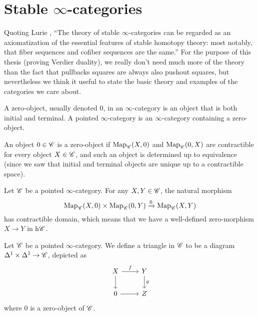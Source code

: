 \documentclass[../../thesis.tex]{subfiles}
\begin{document}
\section{Stable $\infty$-categories}
Quoting Lurie \cite{HA}, ``The theory of stable $\infty$-categories can be regarded as an axiomatization of the essential features of stable homotopy theory: most notably, that fiber sequences and cofiber sequences are the same.''
For the purpose of this thesis (proving Verdier duality), we really don't need much more of the theory than the fact that pullbacks squares are always also pushout squares, but nevertheless we think it useful to state the basic theory and examples of the categories we care about.
\begin{definition}[{\cite[Definition 1.1.1.1.]{HA}}]
    A zero-object, usually denoted $0$, in an $\infty$-category is an object that is both initial and terminal.
    A pointed $\infty$-category is an $\infty$-category containing a zero-object.
\end{definition}
\begin{remark}
    An object $0\in \mathscr{C}$ is a zero-object if $\mathrm{Map}_{\mathscr{C}}(X,0)$ and $\mathrm{Map}_{\mathscr{C}}(0,X)$ are contractible for every object $X\in \mathscr{C}$, and such an object is determined up to equivalence (since we saw that initial and terminal objects are unique up to a contractible space).
\end{remark}
\begin{remark}[{\cite[Remark 1.1.1.3.]{HA}}]
    Let $\mathscr{C}$ be a pointed $\infty$-category.
    For any $X,Y \in \mathscr{C}$, the natural morphism
    \[
        \mathrm{Map}_{\mathscr{C}}(X, 0) \times \mathrm{Map}_{\mathscr{C}}(0, Y) \xrightarrow{0} \mathrm{Map}_{\mathscr{C}}(X,Y)
    \]
    has contractible domain, which means that we have a well-defined zero-morphism $X\to Y$ in $\mathrm{h}\mathscr{C}$.
\end{remark}
\begin{definition}[{\cite[Definition 1.1.1.4.]{HA}}]
    Let $\mathscr{C}$ be a pointed $\infty$-category.
    We define a triangle in $\mathscr{C}$ to be a diagram $\Delta^1 \times \Delta^1 \to \mathscr{C}$, depicted as
    \begin{equation}\label{triangle}\begin{tikzcd}
            X & Y \\
            0 & Z
            \arrow["f", from=1-1, to=1-2]
            \arrow[from=2-1, to=2-2]
            \arrow["g", from=1-2, to=2-2]
            \arrow[from=1-1, to=2-1]
        \end{tikzcd}\end{equation}
    where $0$ is a zero-object of $\mathscr{C}$.
\end{definition}
\end{document}
